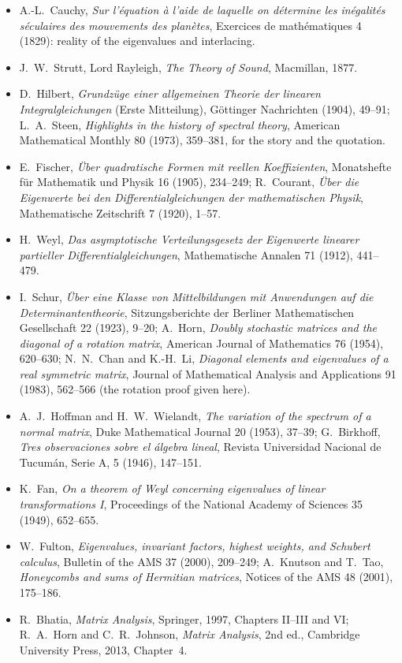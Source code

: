 \begin{itemize}
\item A.-L.~Cauchy, \emph{Sur l'\'equation \`a l'aide de laquelle on d\'etermine les in\'egalit\'es s\'eculaires des
mouvements des plan\`etes}, Exercices de math\'ematiques 4 (1829): reality of the eigenvalues and interlacing.
\item J.~W.~Strutt, Lord Rayleigh, \emph{The Theory of Sound}, Macmillan, 1877.
\item D.~Hilbert, \emph{Grundz\"uge einer allgemeinen Theorie der linearen Integralgleichungen} (Erste Mitteilung), G\"ottinger
Nachrichten (1904), 49--91; L.~A.~Steen, \emph{Highlights in the history of spectral theory}, American Mathematical Monthly
80 (1973), 359--381, for the story and the quotation.
\item E.~Fischer, \emph{\"Uber quadratische Formen mit reellen Koeffizienten}, Monatshefte f\"ur Mathematik und Physik 16
(1905), 234--249; R.~Courant, \emph{\"Uber die Eigenwerte bei den Differentialgleichungen der mathematischen Physik},
Mathematische Zeitschrift 7 (1920), 1--57.
\item H.~Weyl, \emph{Das asymptotische Verteilungsgesetz der Eigenwerte linearer partieller Differentialgleichungen},
Mathematische Annalen 71 (1912), 441--479.
\item I.~Schur, \emph{\"Uber eine Klasse von Mittelbildungen mit Anwendungen auf die Determinantentheorie}, Sitzungsberichte
der Berliner Mathematischen Gesellschaft 22 (1923), 9--20; A.~Horn, \emph{Doubly stochastic matrices and the diagonal of a
rotation matrix}, American Journal of Mathematics 76 (1954), 620--630; N.~N.~Chan and K.-H.~Li, \emph{Diagonal elements and
eigenvalues of a real symmetric matrix}, Journal of Mathematical Analysis and Applications 91 (1983), 562--566 (the
rotation proof given here).
\item A.~J.~Hoffman and H.~W.~Wielandt, \emph{The variation of the spectrum of a normal matrix}, Duke Mathematical Journal 20
(1953), 37--39; G.~Birkhoff, \emph{Tres observaciones sobre el \'algebra lineal}, Revista Universidad Nacional de Tucum\'an,
Serie A, 5 (1946), 147--151.
\item K.~Fan, \emph{On a theorem of Weyl concerning eigenvalues of linear transformations I}, Proceedings of the National
Academy of Sciences 35 (1949), 652--655.
\item W.~Fulton, \emph{Eigenvalues, invariant factors, highest weights, and Schubert calculus}, Bulletin of the AMS 37 (2000),
209--249; A.~Knutson and T.~Tao, \emph{Honeycombs and sums of Hermitian matrices}, Notices of the AMS 48 (2001), 175--186.
\item R.~Bhatia, \emph{Matrix Analysis}, Springer, 1997, Chapters II--III and VI; R.~A.~Horn and C.~R.~Johnson, \emph{Matrix
Analysis}, 2nd ed., Cambridge University Press, 2013, Chapter~4.
\end{itemize}

